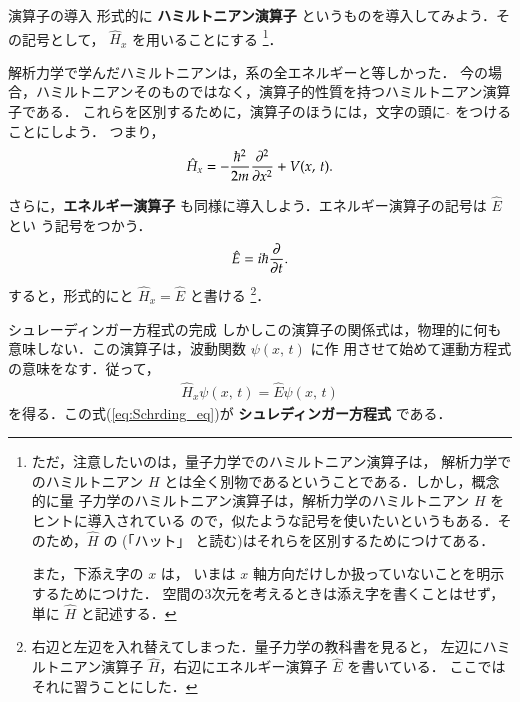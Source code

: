             \begin{mysmallsec}{演算子の導入}
            形式的に \textbf{ハミルトニアン演算子} というものを導入してみよう．その記号として，
            $\hat{H}_{x}$ を用いることにする
                \footnote{
                    ただ，注意したいのは，量子力学でのハミルトニアン演算子は，
                    解析力学でのハミルトニアン $H$ とは全く別物であるということである．しかし，概念的に量
                    子力学のハミルトニアン演算子は，解析力学のハミルトニアン $H$ をヒントに導入されている
                    ので，似たような記号を使いたいというもある．そのため，$\hat{H}$ の$\hat{}$ (「ハット」
                    と読む)はそれらを区別するためにつけてある．

                    また，下添え字の $x$ は， いまは $x$ 軸方向だけしか扱っていないことを明示するためにつけた．
                    空間の3次元を考えるときは添え字を書くことはせず，単に $\hat{H}$ と記述する．
                }．

            解析力学で学んだハミルトニアンは，系の全エネルギーと等しかった．
            今の場合，ハミルトニアンそのものではなく，演算子的性質を持つハミルトニアン演算子である．
            これらを区別するために，演算子のほうには，文字の頭に $\hat{}$ をつけることにしよう．
            つまり，
                \begin{align}
                    \hat{H}_{x} = -\frac{\hbar^{2}}{2m}\frac{\partial^{2}}{\partial x^{2}} + V(x,\,t).
                \end{align}

            さらに，\textbf{エネルギー演算子} も同様に導入しよう．エネルギー演算子の記号は $\hat{E}$ とい
            う記号をつかう．
                \begin{align}
                    \hat{E} = i\hbar\frac{\partial }{\partial t}.
                \end{align}
            すると，形式的にと $\hat{H}_{x} = \hat{E}$ と書ける
                \footnote{
                    右辺と左辺を入れ替えてしまった．量子力学の教科書を見ると，
                    左辺にハミルトニアン演算子 $\hat{H}$，右辺にエネルギー演算子 $\hat{E}$ を書いている．
                    ここではそれに習うことにした．
                }．
            \end{mysmallsec}

            \begin{mysmallsec}{シュレーディンガー方程式の完成}
            しかしこの演算子の関係式は，物理的に何も意味しない．この演算子は，波動関数 $\psi(x,\,t)$ に作
            用させて始めて運動方程式の意味をなす．従って，
                \begin{align}\label{eq:Schrding_eq}
                    \hat{H}_{x} \psi(x,\,t) = \hat{E} \psi(x,\,t)
                \end{align}
            を得る．この式(\ref{eq:Schrding_eq})が \textbf{シュレディンガー方程式} である．
            \end{mysmallsec}

